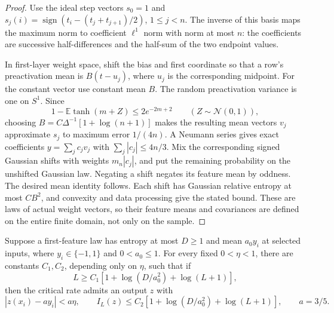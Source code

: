 \begin{proof}
Use the ideal step vectors $s_0=1$ and
$s_j(i)=\operatorname{sign}(t_i-(t_j+t_{j+1})/2)$, $1\le j<n$.
The inverse of this basis maps the maximum norm to coefficient
$\ell^1$ norm with norm at most $n$: the coefficients are successive
half-differences and the half-sum of the two endpoint values.

In first-layer weight space, shift the bias and first coordinate so
that a row's preactivation mean is $B(t-u_j)$, where $u_j$ is the
corresponding midpoint. For the constant vector use constant mean $B$.
The random preactivation variance is one on $S^1$. Since
\[
 1-\mathbb E\tanh(m+Z)\le2e^{-2m+2}\qquad(Z\sim\mathcal N(0,1)),
\]
choosing $B=C\Delta^{-1}[1+\log(n+1)]$ makes the resulting mean
vectors $v_j$ approximate $s_j$ to maximum error $1/(4n)$.
A Neumann series gives exact coefficients
$y=\sum_j c_jv_j$ with $\sum_j|c_j|\le4n/3$.
Mix the corresponding signed Gaussian shifts with weights
$m_n|c_j|$, and put the remaining probability on the unshifted
Gaussian law. Negating a shift negates its feature mean by oddness.
The desired mean identity follows. Each shift has Gaussian relative
entropy at most $CB^2$, and convexity and data processing give the
stated bound. These are laws of actual weight vectors, so their
feature means and covariances are defined on the entire finite domain,
not only on the sample.
\end{proof}

\begin{lemma}
\label{lem:critical-late-amplification-depth}
Suppose a first-feature law has entropy at most $D\ge1$ and mean
$a_0y_i$ at selected inputs, where $y_i\in\{-1,1\}$ and
$0<a_0\le1$. For every fixed $0<\eta<1$, there are constants
$C_1,C_2$, depending only on $\eta$, such that if
\[
 L\ge C_1[1+\log(D/a_0^2)+\log(L+1)],
\]
then the critical rate admits an output $z$ with
\[
 |z(x_i)-a y_i|<a\eta,
 \qquad I_L(z)\le C_2[1+\log(D/a_0^2)+\log(L+1)],
 \qquad a=3/5.
\]
\end{lemma}

